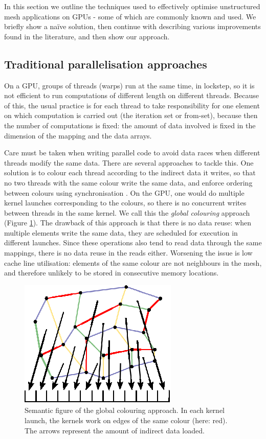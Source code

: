 In this section we outline the techniques used to effectively optimise
unstructured mesh applications on GPUs - some of which are commonly known and used. We briefly show a naïve solution, then
continue with describing various improvements found in the literature, and then show our
approach.

\subsection{Traditional parallelisation approaches}

On a GPU, groups of threads (warps) run at the same time, in lockstep, so it is
not efficient to run computations of different length on different threads.
Because of this, the usual practice is for each thread to take responsibility
for one element on which computation is carried out (the iteration set or
from-set), because then the number of computations is fixed: the amount of data
involved is fixed in the dimension of the mapping and the data arrays.

Care must be taken when writing parallel code to avoid data races when different
threads modify the same data. There are several approaches to tackle this. One solution is to colour each thread according to the indirect data it
writes, so that no two threads with the same colour write the same data, and
enforce ordering between colours using synchronisation \cite{Zegard2013}. On the GPU, one would do
multiple kernel launches corresponding to the colours, so there is no concurrent
writes between threads in the same kernel. We call this the \emph{global
colouring} approach (Figure \ref{fig:unstructured_global}). The drawback of this
approach is that there is no data reuse: when multiple elements write the same data, they
are scheduled for execution in different launches. Since these operations also
tend to read data through the same mappings, there is no data reuse in the reads
either. Worsening the issue is low cache line utilisation: elements of the same
colour are not neighbours in the mesh, and therefore unlikely to be stored in
consecutive memory locations.

\begin{figure}[Htpb]
  \centering
  \includegraphics{fig/svg/unstructured_global.eps}
  \caption{Semantic figure of the global colouring approach. In each kernel
  launch, the kernels work on edges of the same colour (here: red). The arrows
  represent the amount of indirect data loaded.}
  \label{fig:unstructured_global}
\end{figure}

